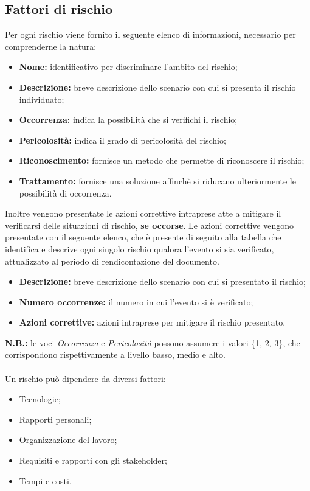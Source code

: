 \subsection{Fattori di rischio}

Per ogni rischio viene fornito il seguente elenco di informazioni, necessario per comprenderne la natura:
\begin{itemize}
	\item \textbf{Nome:} identificativo per discriminare l'ambito del rischio;
	\item \textbf{Descrizione:} breve descrizione dello scenario con cui si presenta il rischio individuato;
	\item \textbf{Occorrenza:} indica la possibilità che si verifichi il rischio;
	\item \textbf{Pericolosità:} indica il grado di pericolosità del rischio;
	\item \textbf{Riconoscimento:} fornisce un metodo che permette di riconoscere il rischio;
	\item \textbf{Trattamento:} fornisce una soluzione affinchè si riducano ulteriormente le possibilità di occorrenza.
\end{itemize}

Inoltre vengono presentate le azioni correttive intraprese atte a mitigare il verificarsi delle situazioni di rischio, \textbf{se occorse}. Le azioni correttive vengono presentate con il seguente elenco, che è presente di seguito alla tabella che identifica e descrive ogni singolo rischio qualora l'evento si sia verificato, attualizzato al periodo di rendicontazione del documento.

\begin{itemize}
	\item\textbf{Descrizione:} breve descrizione dello scenario con cui si presentato il rischio;
	\item\textbf{Numero occorrenze:} il numero in cui l'evento si è verificato;
	\item\textbf{Azioni correttive:} azioni intraprese per mitigare il rischio presentato.
\end{itemize}

\textbf{N.B.:} le voci \textit{Occorrenza} e \textit{Pericolosità} possono assumere i valori \{1, 2, 3\}, che corrispondono rispettivamente a livello basso, medio e alto.\\\\
Un rischio può dipendere da diversi fattori:
\begin{itemize}
	\item Tecnologie;
	\item Rapporti personali;
	\item Organizzazione del lavoro;
	\item Requisiti e rapporti con gli stakeholder;
	\item Tempi e costi.
\end{itemize}

